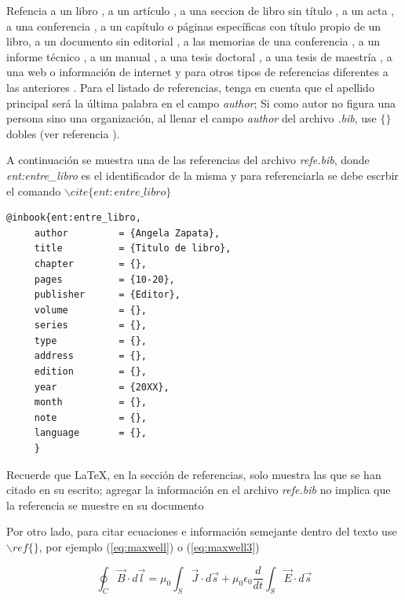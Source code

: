 Refencia a un libro \cite{lib:libro}, a un artículo \cite{art:baker}, a una seccion de libro sin título \cite{sec:pediatria}, a un acta \cite{act:acta}, a una conferencia \citep{con:conferencia}, a un capítulo o páginas específicas con título propio de un libro\citep[pp. 7-10]{ent:entre_libro},  a un documento sin editorial \citep{fll:folleto}, a las memorias de una conferencia \citep{ina:articulo_en_acta}, a un informe técnico \citep{inf:informe_tecnico}, a un manual \citep{man:manual}, a una tesis doctoral \citep{phd:phd_tesis}, a una tesis de maestría \citep{tes:tesis}, a una web o información de internet \citep{web:web} y para otros tipos de referencias diferentes a las anteriores \cite{opc:film}. Para el listado de referencias, tenga en cuenta que el apellido principal será la última palabra en el campo \textit{author}; Si como autor no figura una persona sino una organización, al llenar el campo \textit{author} del archivo \textit{.bib}, use $\{\}$ dobles (ver referencia \citep{lib:ieee}).

A continuación se muestra una de las referencias del archivo \textit{refe.bib}, donde \linebreak \textit{ent:entre\_libro} es el identificador de la misma y para referenciarla se debe escrbir el comando $\backslash cite\{ent:entre\_libro\}$ 

\newpage
\begin{verbatim}
@inbook{ent:entre_libro,
     author         = {Angela Zapata},
     title          = {Titulo de libro},
     chapter        = {},
     pages          = {10-20},
     publisher      = {Editor},
     volume         = {},
     series	        = {},
     type           = {},
     address        = {},
     edition        = {},
     year           = {20XX},
     month          = {},
     note           = {},
     language       = {},
     }
\end{verbatim}

Recuerde que \LaTeX , en la sección de referencias, solo muestra las que se han citado en su escrito; agregar la información en el archivo \textit{refe.bib} no implica que la referencia se muestre en su documento

Por otro lado, para citar ecuaciones e información semejante dentro del texto use $\backslash ref\{\}$, por ejemplo (\ref{eq:maxwell}) o (\ref{eq:maxwell3})

\begin{equation}\label{eq:maxwell}
    \oint_C \vec{B}\cdot d \vec{l}=\mu_0\int_S \vec{J}\cdot d \vec{s}+\mu_0\epsilon_0\dfrac{d }{d t}\int_S \vec{E}\cdot d \vec{s}
\end{equation}

